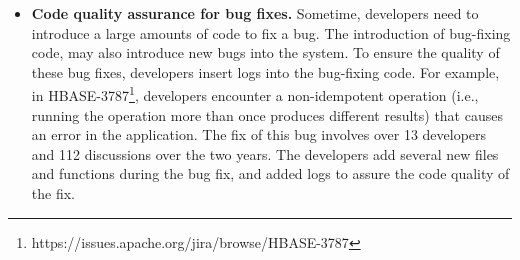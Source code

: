 \begin{itemize}
\item \textbf{Code quality assurance for bug fixes.} Sometime, developers need to introduce a large amounts of code to fix a bug. The introduction of bug-fixing code, may also introduce new bugs into the system. To ensure the quality of these bug fixes, developers insert logs into the bug-fixing code. For example, in HBASE-3787\footnote{https://issues.apache.org/jira/browse/HBASE-3787}, developers encounter a non-idempotent operation (i.e., running the operation more than once produces different results) that causes an error in the application. The fix of this bug involves over 13 developers and 112 discussions over the two years. The developers add several new files and functions during the bug fix, and added logs to assure the code quality of the fix. 
\end{itemize}
